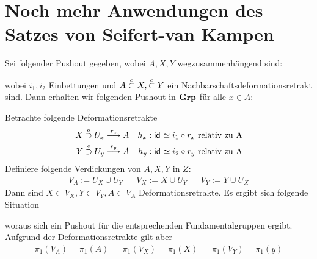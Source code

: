 \section{Noch mehr Anwendungen des Satzes von Seifert-van Kampen}

\Satz{}
Sei folgender Pushout gegeben, wobei $A, X, Y$ wegzusammenhängend sind:
\begin{center}
\end{center}
wobei $i_1, i_2$ Einbettungen und $A \overset{c}{\subset} X, \overset{c}{\subset} Y$ ein Nachbarschaftsdeformationsretrakt sind.
Dann erhalten wir folgenden Pushout in $\textbf{Grp}$ für alle $x \in A$:
\begin{center}
\end{center}

\begin{Beweis}{}
Betrachte folgende Deformationsretrakte
\begin{align*}
X \overset{o}{\supset} U_x \overset{r_x}{\longrightarrow} A && h_x : \textsf{id}_{} \simeq i_1 \circ r_x \text{ relativ zu A}\\
Y \overset{o}{\supset} U_y \overset{r_y}{\longrightarrow} A && h_y : \textsf{id}_{} \simeq i_2 \circ r_y \text{ relativ zu A}\\
\end{align*}
Definiere folgende Verdickungen von $A,X,Y$ in $Z$:
\begin{align*}
V_A := U_X \cup U_Y && V_X := X \cup U_Y && V_Y := Y \cup U_X
\end{align*}
Dann sind $X \subset V_X, Y \subset V_Y, A \subset V_A$ Deformationsretrakte. Es ergibt sich folgende Situation
\begin{center}
\end{center}
woraus sich ein Pushout für die entsprechenden Fundamentalgruppen ergibt. Aufgrund der Deformationsretrakte gilt aber
\begin{align*}
\pi_1(V_A) = \pi_1(A) && \pi_1(V_X) = \pi_1(X) && \pi_1(V_Y) = \pi_1(y)
\end{align*}

\end{Beweis}


